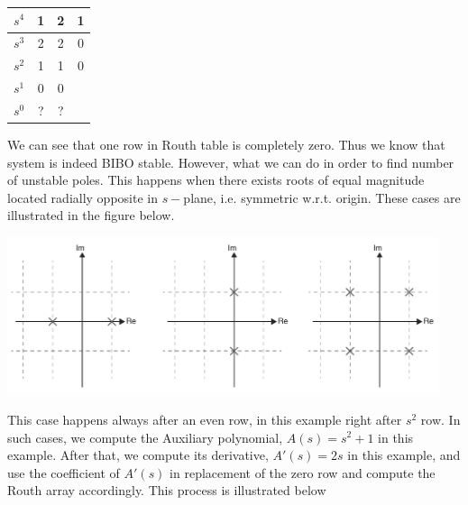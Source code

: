 \documentclass[twoside]{article}
\begin{document}
\begin{minipage}[h]{1\linewidth}
\begin{center}
\begin{tabular}{|c || c || c c |}
\hline
$s^4$ & 1 & 2 & 1 
\\ \hline
$s^3$ & 2 & 2 & 0
\\ \hline
$s^2$ & 1 & 1 & 0
\\ \hline
$s^1$ & 0 & 0 &
\\ \hline
$s^0$ & ? & ? & 
\\ \hline
\end{tabular}
\end{center}
\end{minipage}

We can see that one row in Routh table is completely zero. 
Thus we know that system is indeed BIBO stable. However,
what we can do in order to find number of unstable poles. 
This happens when there exists roots of equal magnitude
located radially opposite in $s-$plane, i.e. symmetric
w.r.t. origin. These cases are illustrated in the figure below.

\vspace{6pt}

\begin{minipage}[h]{1\linewidth}
    \begin{center}
      \includegraphics[width=0.95\textwidth]{caseII}
    \end{center}
\end{minipage}

\vspace{6pt}

This case happens always after an even row, in this example right after $s^2$ row. In such 
cases, we compute the Auxiliary polynomial, $A(s) = s^2 + 1$ in this
example. After that, we compute its derivative, $A'(s) = 2 s$ in this example,
and use the coefficient of $A'(s)$ in replacement of the zero row and compute
the Routh array accordingly. This process is illustrated below
\end{document}
